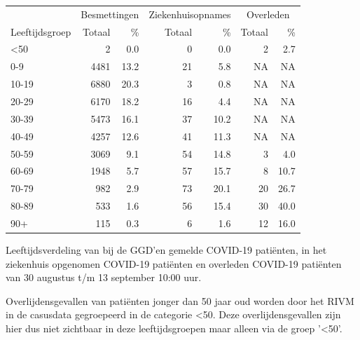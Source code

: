 \documentclass[
  english,
  man,floatsintext]{apa6}
\begin{document}
\begin{table}
\centering\begingroup\fontsize{11}{13}\selectfont

\begin{threeparttable}
\begin{tabular}{lrrrrrr}
\toprule
\multicolumn{1}{c}{ } & \multicolumn{2}{c}{Besmettingen} & \multicolumn{2}{c}{Ziekenhuisopnames} & \multicolumn{2}{c}{Overleden} \\
\cmidrule(l{3pt}r{3pt}){2-3} \cmidrule(l{3pt}r{3pt}){4-5} \cmidrule(l{3pt}r{3pt}){6-7}
Leeftijdsgroep & Totaal & \% & Totaal & \% & Totaal & \%\\
\midrule
<50 & 2 & 0.0 & 0 & 0.0 & 2 & 2.7\\
0-9 & 4481 & 13.2 & 21 & 5.8 & NA & NA\\
10-19 & 6880 & 20.3 & 3 & 0.8 & NA & NA\\
20-29 & 6170 & 18.2 & 16 & 4.4 & NA & NA\\
30-39 & 5473 & 16.1 & 37 & 10.2 & NA & NA\\
40-49 & 4257 & 12.6 & 41 & 11.3 & NA & NA\\
50-59 & 3069 & 9.1 & 54 & 14.8 & 3 & 4.0\\
60-69 & 1948 & 5.7 & 57 & 15.7 & 8 & 10.7\\
70-79 & 982 & 2.9 & 73 & 20.1 & 20 & 26.7\\
80-89 & 533 & 1.6 & 56 & 15.4 & 30 & 40.0\\
90+ & 115 & 0.3 & 6 & 1.6 & 12 & 16.0\\
\bottomrule
\end{tabular}
\begin{tablenotes}
\item[1] Leeftijdsverdeling van bij de GGD’en gemelde COVID-19 patiënten, in het ziekenhuis opgenomen COVID-19 patiënten en overleden COVID-19 patiënten van 30 augustus t/m 13 september 10:00 uur.
\item[2] Overlijdensgevallen van patiënten jonger dan 50 jaar oud worden door het RIVM in de casusdata gegroepeerd in de categorie <50. Deze overlijdensgevallen zijn hier dus niet zichtbaar in deze leeftijdsgroepen maar alleen via de groep '<50'.
\end{tablenotes}
\end{threeparttable}
\endgroup{}
\end{table}

\newpage
\end{document}
